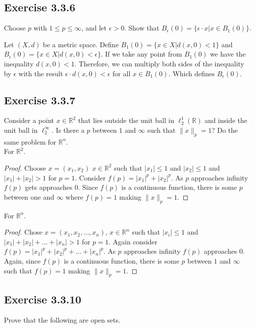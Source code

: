 \documentclass{tufte-book}
\theoremstyle{mytheoremstyle}
\theoremstyle{mylemstyle}
\theoremstyle{mydefstyle}
\begin{document}
\subsection{Exercise 3.3.6}
Choose $p$ with $1 \leq p \leq \infty$, and let $\epsilon >0$.  Show that $B_\epsilon(0) = \{\epsilon \cdot x | x \in B_1(0)\}$. 

Let $(X,d)$ be a metric space.  Define $B_1(0)=\{x \in X | d(x, 0) < 1 \}$ and $B_\epsilon(0)=\{x \in X | d(x, 0) < \epsilon \}$.  If we take any point from $B_1(0)$ we have the inequality $d(x,0) < 1$.  Therefore, we can multiply both sides of the inequality by $\epsilon$ with the result $\epsilon \cdot d(x, 0) < \epsilon$ for all $x \in B_1(0)$.  Which defines $B_\epsilon(0)$.

\subsection{Exercise 3.3.7}
Consider a point $x \in \mathbb{R}^2$ that lies outside the unit ball in $\ell_2^1(\mathbb{R})$ and inside the unit ball in $\ell_2^\infty$.  Is there a $p$ between $1$ and $\infty$ such that $\|x\|_p=1$?  Do the same problem for $\mathbb{R}^n$.\\
For $\mathbb{R}^2$.
\begin{proof}
Choose $x = (x_1, x_2)$ $x \in \mathbb{R}^2$ such that $|x_1| \leq 1$ and $|x_2| \leq 1$ and $|x_1| + |x_2| > 1$ for $p=1$. Consider $f(p) = |x_1|^p + |x_2|^p$.  As $p$ approaches infinity $f(p)$ gets approaches $0$. Since $f(p)$ is a continuous function, there is some $p$ between one and $\infty$ where $f(p) = 1$ making $\|x\|_p = 1$.
\end{proof}
For $\mathbb{R}^n$.
\begin{proof}
Chose $x = (x_1, x_2,...,x_n)$, $x \in \mathbb{R}^n$ such that $|x_i| \leq 1$ and $|x_1| + |x_2| +...+|x_n| > 1$ for $p=1$.  Again consider $f(p) = |x_1|^p + |x_2|^p +...+|x_n|^p$.  As $p$ approaches infinity $f(p)$ approaches $0$.  Again, since $f(p)$ is a continuous function, there is some $p$ between $1$ and $\infty$ such that $f(p) = 1$ making $\|x\|_p = 1$.
\end{proof}

\subsection{Exercise 3.3.10}
Prove that the following are open sets.
\end{document}
